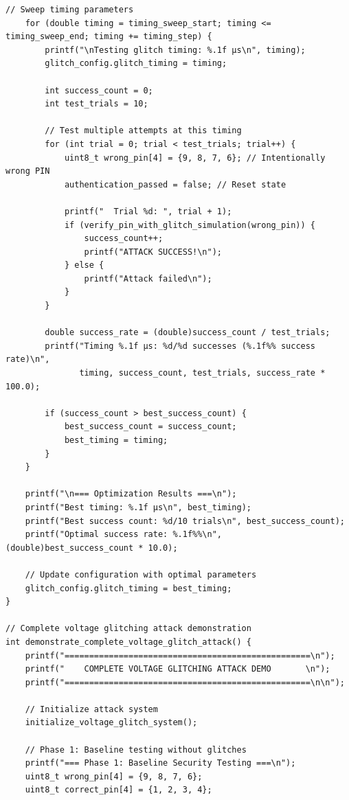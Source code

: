 \documentclass[12pt,a4paper]{article}
\begin{document}
\begin{lstlisting}[caption={Complete Voltage Glitching Attack System}]
    // Sweep timing parameters
    for (double timing = timing_sweep_start; timing <= timing_sweep_end; timing += timing_step) {
        printf("\nTesting glitch timing: %.1f μs\n", timing);
        glitch_config.glitch_timing = timing;
        
        int success_count = 0;
        int test_trials = 10;
        
        // Test multiple attempts at this timing
        for (int trial = 0; trial < test_trials; trial++) {
            uint8_t wrong_pin[4] = {9, 8, 7, 6}; // Intentionally wrong PIN
            authentication_passed = false; // Reset state
            
            printf("  Trial %d: ", trial + 1);
            if (verify_pin_with_glitch_simulation(wrong_pin)) {
                success_count++;
                printf("ATTACK SUCCESS!\n");
            } else {
                printf("Attack failed\n");
            }
        }
        
        double success_rate = (double)success_count / test_trials;
        printf("Timing %.1f μs: %d/%d successes (%.1f%% success rate)\n", 
               timing, success_count, test_trials, success_rate * 100.0);
        
        if (success_count > best_success_count) {
            best_success_count = success_count;
            best_timing = timing;
        }
    }
    
    printf("\n=== Optimization Results ===\n");
    printf("Best timing: %.1f μs\n", best_timing);
    printf("Best success count: %d/10 trials\n", best_success_count);
    printf("Optimal success rate: %.1f%%\n", (double)best_success_count * 10.0);
    
    // Update configuration with optimal parameters
    glitch_config.glitch_timing = best_timing;
}

// Complete voltage glitching attack demonstration
int demonstrate_complete_voltage_glitch_attack() {
    printf("==================================================\n");
    printf("    COMPLETE VOLTAGE GLITCHING ATTACK DEMO       \n");
    printf("==================================================\n\n");
    
    // Initialize attack system
    initialize_voltage_glitch_system();
    
    // Phase 1: Baseline testing without glitches
    printf("=== Phase 1: Baseline Security Testing ===\n");
    uint8_t wrong_pin[4] = {9, 8, 7, 6};
    uint8_t correct_pin[4] = {1, 2, 3, 4};
    

\end{lstlisting}
\end{document}
